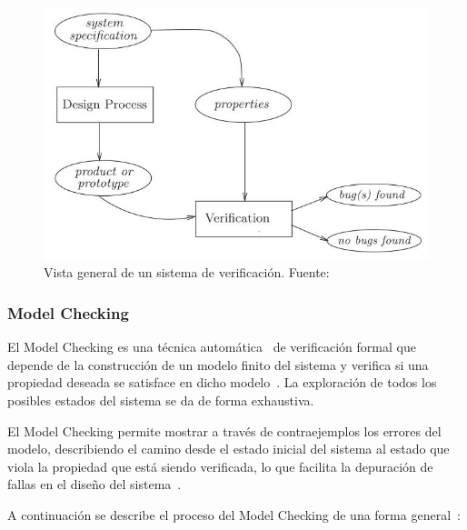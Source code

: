 \begin{figure}[!h]
  \centering
  \includegraphics[scale=0.6]{./images/vistaSistemaVerificacion.jpg}
  \caption{Vista general de un sistema de 
verificaci\'on. Fuente:~\cite[p.~3]{Baier2008}}
  \label{fig:sisVerificacion}
\end{figure}



\subsubsection{Model Checking}

El Model Checking es una t\'ecnica autom\'atica~\cite{Vaovic2005} de 
verificaci\'on formal que depende de la construcci\'on de un modelo finito del 
sistema y verifica si una propiedad deseada se satisface en dicho 
modelo~\cite{Clarke1996}. La exploraci\'on de todos los posibles estados del 
sistema 
se da de forma exhaustiva.

El Model Checking permite mostrar a trav\'es de contraejemplos los errores del 
modelo, describiendo el camino desde el estado inicial del sistema al estado que 
viola la propiedad que est\'a siendo verificada, lo que facilita la depuraci\'on 
de fallas en el dise\~no del sistema~\cite{Baier2008,Vaovic2005}.

A continuaci\'on se describe el proceso del Model Checking de una forma 
general~\cite{Baier2008}:

